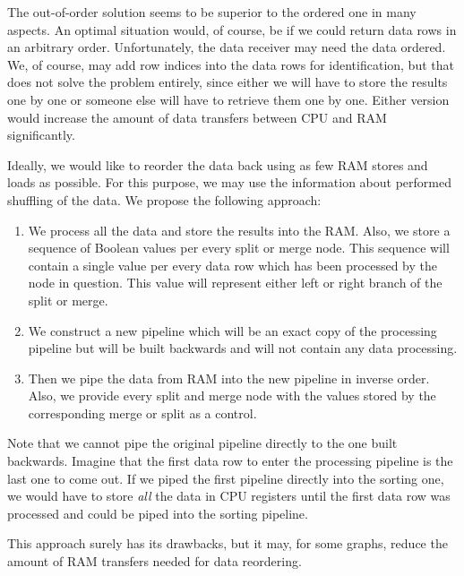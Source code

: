 The out-of-order solution seems to be superior to the ordered one in many aspects. An optimal situation would, of course, be if we could return data rows in an arbitrary order. Unfortunately, the data receiver may need the data ordered.  We, of course, may add row indices into the data rows for identification, but that does not solve the problem entirely, since either we will have to store the results one by one or someone else will have to retrieve them one by one. Either version would increase the amount of data transfers between CPU and RAM significantly. 


Ideally, we would like to reorder the data back using as few RAM stores and loads as possible. For this purpose, we may use the information about performed shuffling of the data. We propose the following approach:
\begin{enumerate}
  \item We process all the data and store the results into the RAM. Also, we store a sequence of Boolean values per every split or merge node. This sequence will contain a single value per every data row which has been processed by the node in question. This value will represent either left or right branch of the split or merge.
  \item We construct a new pipeline which will be an exact copy of the processing pipeline but will be built backwards and will not contain any data processing.
  \item Then we pipe the data from RAM into the new pipeline in inverse order. Also, we provide every split and merge node with the values stored by the corresponding merge or split as a control.
\end{enumerate}

\begin{rem}
  Note that we cannot pipe the original pipeline directly to the one built backwards. Imagine that the first data row to enter the processing pipeline is the last one to come out. If we piped the first pipeline directly into the sorting one, we would have to store \emph{all} the data in CPU registers until the first data row was processed and could be piped into the sorting pipeline.
\end{rem}

This approach surely has its drawbacks, but it may, for some graphs, reduce the amount of RAM transfers needed for data reordering.
